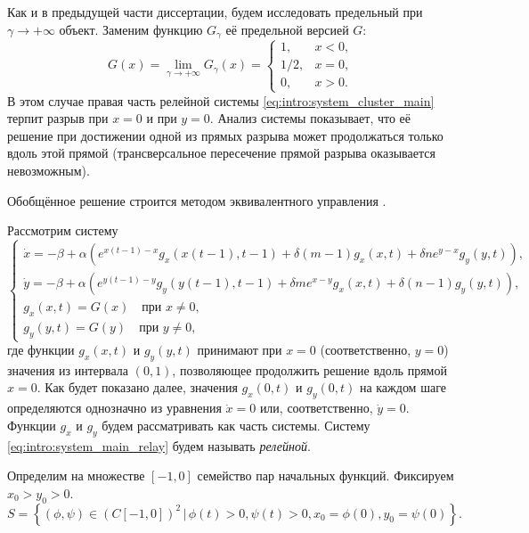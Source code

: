 Как и в предыдущей части диссертации, будем исследовать предельный при $\gamma \to +\infty$ объект. Заменим функцию $G_{\gamma}$ её предельной версией $G$:
\begin{equation}
	\label{eq:intro:relay_G_tilde}
	G(x) = \lim\limits_{\gamma \to +\infty} G_{\gamma}(x) = 
	\begin{cases}
		1, & x < 0,\\
		1/2, & x = 0,\\
		0, & x > 0.
	\end{cases}
\end{equation}
%
В этом случае правая часть релейной системы \eqref{eq:intro:system_cluster_main} терпит разрыв при $x = 0$ и при $y = 0$. Анализ системы показывает, что её решение при достижении одной из прямых разрыва может продолжаться только вдоль этой прямой (трансверсальное пересечение прямой разрыва оказывается невозможным).

Обобщённое решение строится методом эквивалентного управления \cite[\S 4, с. 54]{Filippov1988}.

Рассмотрим систему
%
\small
\begin{equation}
	\label{eq:intro:system_main_relay}
	\begin{cases}
		\dot{x} = -\beta + \alpha \left(e^{x(t - 1) - x} g_x(x(t - 1), t - 1) + \delta (m - 1) g_x(x, t) + \delta n e^{y - x} g_y(y, t)\right),\\
		\dot{y} = -\beta + \alpha \left(e^{y(t - 1) - y} g_y(y(t - 1), t - 1) + \delta m e^{x - y} g_x(x, t) + \delta (n - 1) g_y(y, t)\right),\\
		g_x(x, t) = G(x) \quad\text{при } x \neq 0,\\
		g_y(y, t) = G(y) \quad\text{при } y \neq 0,
	\end{cases}
\end{equation}
\normalsize
%
где функции $g_x(x, t)$ и $g_y(y, t)$ принимают при $x = 0$ (соответственно, $y = 0$) значения из интервала $(0, 1)$, позволяющее продолжить решение вдоль прямой $x = 0$. Как будет показано далее, значения $g_x(0, t)$ и $g_y(0, t)$ на каждом шаге определяются однозначно из уравнения $\dot{x} = 0$ или, соответственно, $\dot{y} = 0$. Функции $g_x$ и $g_y$ будем рассматривать как часть системы.
%
Систему \eqref{eq:intro:system_main_relay} будем называть \emph{релейной}.

Определим на множестве $[-1, 0]$ семейство пар начальных функций. Фиксируем $x_0 > y_0 > 0$.
\begin{equation}
	\label{eq:intro:initial_set}
	S = \left\{(\phi, \psi) \in (C[-1, 0])^2 \,|\, \phi(t) > 0, \psi(t) > 0, x_0 = \phi(0), y_0 = \psi(0)\right\}.
\end{equation}

